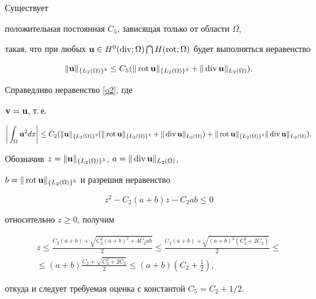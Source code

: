 \begin{thms}\label{t7}


Существует


положительная постоянная $C_5$, зависящая только от области $\Omega$,


такая, что при любых $\bold{u}\in H^0(\Div;\Omega)\bigcap H(


\Rot;\Omega)$ будет выполняться неравенство 


$$


\|\bold{u}\|_{\{L_2(\Omega)\}^3}\leq C_5(\|


\Rot\bold{u}\|_{\{L_2(\Omega)\}^3}+\|\Div \bold{u}\|_{L_2(\Omega)}).


$$


\end{thms}





\begin{pf}


Справедливо неравенство \eqref{o2}, где


$\bold{v}=\bold{u}$, т.\,е.


$$


\bigg|\int_{\Omega}\bold{u}^2dx\bigg|\leq C_2(\|


\bold{u} \|_{\{ L_2(\Omega)\}^3}(\| \Rot\bold{u} \|_{\{


L_2(\Omega)\}^3}+\| \Div\bold{u}


\|_{L_2(\Omega)})+\|\Rot\bold{u} \|_{\{ L_2(\Omega)\}


^3}\|\Div \bold{u} \|_{L_2(\Omega)}).


$$





Обозначив $z=\|\bold{u} \|_{\{


L_2(\Omega)\}^3}$, $a=\|\Div \bold{u} \|_{L_2(\Omega)}$,


$b=\|\operatorname{rot}\bold{u} \|_{\{ L_2(\Omega)\}^3}$ и разрешив неравенство


$$


z^2-C_2(a+b)z-C_2ab\leq 0


$$


относительно $z\geq 0$, получим


\begin{multline*}


z\leq\frac{C_2(a+b)+\sqrt{C_2^2(a+b)^2+4C_2ab}}{2}\leq


\frac{C_2(a+b)+\sqrt{(a+b)^2(C_2^2+2C_2)}}{2}\leq\\


\leq(a+b)\frac{C_2+\sqrt{C^2_2+2C_2}}{2}\leq


(a+b) (C_2+\tfrac{1}{2}),


\end{multline*}


откуда и следует требуемая оценка с константой $C_5=C_2+1/2$.


\end{pf}





